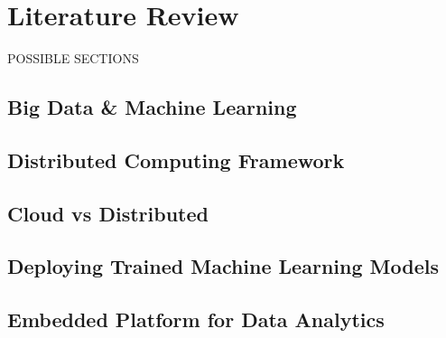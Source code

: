 
\section{Literature Review}
POSSIBLE SECTIONS
\subsection{Big Data \& Machine Learning}
\subsection{Distributed Computing Framework}
\subsection{Cloud vs Distributed}
\subsection{Deploying Trained Machine Learning Models}
\subsection{Embedded Platform for Data Analytics}



